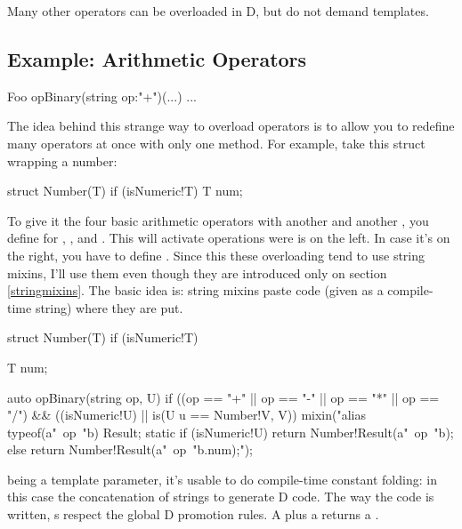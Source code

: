 %


Many other operators can be overloaded in D, but do not demand templates.

\subsection{Example: Arithmetic Operators}


\begin{dcode}
Foo opBinary(string op:"+")(...) { ... }
\end{dcode}

The idea behind this strange way to overload operators is to allow you to redefine many operators at once with only one method. For example, take this struct wrapping a number:

\begin{dcode}
struct Number(T) if (isNumeric!T)
{
    T num;
}
\end{dcode}

To give it the four basic arithmetic operators with another  and another , you define  for \DD{+}, \DD{-}, \DD{*} and \DD{/}. This will activate operations were  is on the left. In case it's on the right, you have to define . Since this these overloading tend to use string mixins, I'll use them even though they are introduced only on section \ref{stringmixins}. The basic idea is: string mixins paste code (given as a compile-time string) where they are put.

\begin{dcode}
struct Number(T) if (isNumeric!T)
{
    T num;

    auto opBinary(string op, U) 
         if ((op == "+" || op == "-" || op == "*" || op == "/") 
         && ((isNumeric!U) || is(U u == Number!V, V))
    {
 mixin("alias typeof(a"~op~"b) Result;     
        static if (isNumeric!U)
            return Number!Result(a"~op~"b);
        else
            return Number!Result(a"~op~"b.num);");
    }    
}
\end{dcode}

 being a template parameter, it's usable to do compile-time constant folding: in this case the concatenation of strings to generate D code. The way the code is written, s respect the global D promotion rules. A  plus a  returns a .

